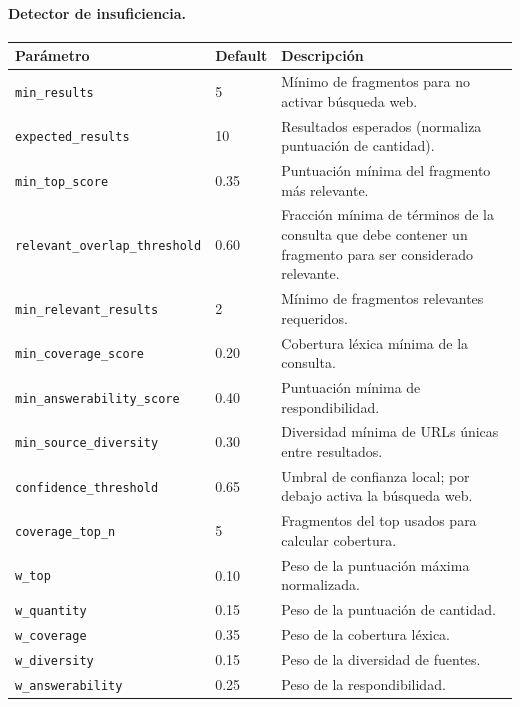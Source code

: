 \documentclass[11pt]{article}
\begin{document}
\paragraph{Detector de insuficiencia.}

\begin{center}
\begin{tabular}{lll}
\toprule
\textbf{Parámetro} & \textbf{Default} & \textbf{Descripción} \\
\midrule
\texttt{min\_results}                 & 5    & Mínimo de fragmentos para no activar búsqueda web. \\
\texttt{expected\_results}            & 10   & Resultados esperados (normaliza puntuación de cantidad). \\
\texttt{min\_top\_score}              & 0.35 & Puntuación mínima del fragmento más relevante. \\
\texttt{relevant\_overlap\_threshold} & 0.60 & Fracción mínima de términos de la consulta que debe
                                               contener un fragmento para ser considerado relevante. \\
\texttt{min\_relevant\_results}       & 2    & Mínimo de fragmentos relevantes requeridos. \\
\texttt{min\_coverage\_score}         & 0.20 & Cobertura léxica mínima de la consulta. \\
\texttt{min\_answerability\_score}    & 0.40 & Puntuación mínima de respondibilidad. \\
\texttt{min\_source\_diversity}       & 0.30 & Diversidad mínima de URLs únicas entre resultados. \\
\texttt{confidence\_threshold}        & 0.65 & Umbral de confianza local; por debajo activa la
                                               búsqueda web. \\
\texttt{coverage\_top\_n}             & 5    & Fragmentos del top usados para calcular cobertura. \\
\texttt{w\_top}                       & 0.10 & Peso de la puntuación máxima normalizada. \\
\texttt{w\_quantity}                  & 0.15 & Peso de la puntuación de cantidad. \\
\texttt{w\_coverage}                  & 0.35 & Peso de la cobertura léxica. \\
\texttt{w\_diversity}                 & 0.15 & Peso de la diversidad de fuentes. \\
\texttt{w\_answerability}             & 0.25 & Peso de la respondibilidad. \\
\bottomrule
\end{tabular}
\end{center}
\end{document}
